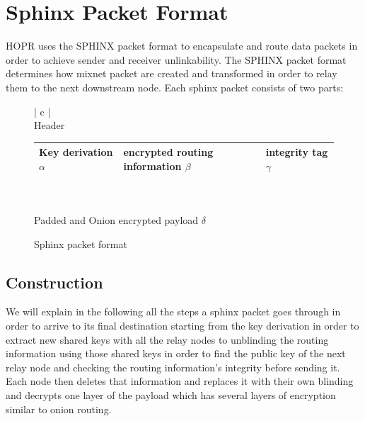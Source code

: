 \section{Sphinx Packet Format}

HOPR uses the SPHINX packet format \cite{sphinxpaper} to encapsulate and route data packets in order to achieve sender and receiver unlinkability. The SPHINX packet format determines how mixnet packet are created and transformed in order to relay them to the next downstream node. Each sphinx packet consists of two parts:

\begin{figure}[H]
    \centering
    \begin{tabular}{| c |}
        \hline
        \\[-0.8em]
        Header                                       \\[0.2em]
        \begin{tabular}{| m{} | m{} | m{} |}
            \hline
            Key derivation $\alpha$ & encrypted routing information $\beta$ & integrity tag $\gamma$ \\
            \hline
        \end{tabular}                    \\[0.9em]
        \hline
        \hline
        \\[-0.7em]
        Padded and Onion encrypted payload  $\delta$ \\[0.7em]
        \hline
    \end{tabular}
    \label{fig:Sphinx packet format}
    \caption{Sphinx packet format}
\end{figure}

\subsection{Construction}
We will explain in the following all the steps a sphinx packet goes through in order to arrive to its final destination starting from the key derivation in order to extract new shared keys with all the relay nodes to unblinding the routing information using those shared keys in order to find the public key of the next relay node and checking the routing information's integrity before sending it. Each node then deletes that information and replaces it with their own blinding and decrypts one layer of the payload which has several layers of encryption similar to onion routing.
